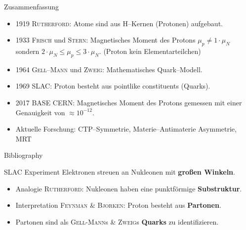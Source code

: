\documentclass[t,9pt]{beamer}
\begin{document}
        \begin{frame}{Zusammenfassung}
                \begin{itemize}
                        \item 1919 \textsc{Rutherford}: Atome sind aus H--Kernen (Protonen) aufgebaut.
                        \item 1933 \textsc{Frisch} und \textsc{Stern}: Magnetisches Moment des Protons $\mu _p\neq 1\cdot \mu _N$ sondern $2\cdot \mu _N\leq \mu _p\leq 3\cdot \mu _N$. (Proton kein Elementarteilchen)
                        \item 1964 \textsc{Gell--Mann} und \textsc{Zweig}: Mathematisches Quark--Modell.
                        \item 1969 SLAC: Proton besteht aus \glqq pointlike constituents\grqq{} (Quarks).
                        \item 2017 BASE CERN: Magnetisches Moment des Protons gemessen mit einer Genauigkeit von $\approx 10^{-12}$.
                        \item Aktuelle Forschung: CTP--Symmetrie, Materie--Antimaterie Asymmetrie, MRT
                \end{itemize}         
        \end{frame}

        \begin{frame}[allowframebreaks]{Bibliography}
                \tiny
                
                
        \end{frame}

        \iffalse\begin{frame}{SLAC Experiment}
                Elektronen streuen an Nukleonen mit \textbf{großen Winkeln}. %
                \begin{itemize}
                        \item Analogie \textsc{Rutherford}: Nukleonen haben eine punktförmige \textbf{Substruktur}.
                                \pause
                        \item Interpretation \textsc{Feynman} \& \textsc{Bjorken}: Proton besteht aus \textbf{Partonen}.
                        \item Partonen sind als \textsc{Gell-Mann}s \& \textsc{Zweig}s \textbf{Quarks} zu identifizieren. %
                \end{itemize}
        \end{frame}
\end{document}
